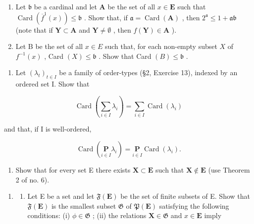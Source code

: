 \begin{enumerate}
\def\labelenumi{(\alph{enumi})}
\item
  Let \(\mathfrak{b}\) be a cardinal and let \(\mathbf{A}\) be the set of all \(x \in \mathbf{E}\) such that \(\operatorname{Card}(\overline{f}^1(x)) \leqslant \mathfrak{b}\) . Show that, if \(\mathfrak{a} = \operatorname{Card}(\mathbf{A})\) , then \(2^{\mathfrak{a}} \leqslant 1 + \mathfrak{a}\mathfrak{b}\) (note that if \(\mathbf{Y} \subset \mathbf{A}\) and \(\mathbf{Y} \neq \emptyset\) , then \(f(\mathbf{Y}) \in \mathbf{A}\) ).
\item
  Let B be the set of all \(x \in E\) such that, for each non-empty subset \(X\) of \(f^{-1}(x)\) , Card \((X) \leqslant \mathfrak{b}\) . Show that Card \((B) \leqslant \mathfrak{b}\) .
\end{enumerate}

\begin{enumerate}
\def\labelenumi{\arabic{enumi}.}
\setcounter{enumi}{4}
\tightlist
\item
  Let \((\lambda_{t})_{t\in I}\) be a family of order-types (§2, Exercise 13), indexed by an ordered set I. Show that
\end{enumerate}

\[
\operatorname{Card} \left(\sum_ {i \in I} \lambda_ {i}\right) = \sum_ {i \in I} \operatorname{Card} \left(\lambda_ {i}\right)
\]

and that, if I is well-ordered,

\[
\operatorname{Card} \left(\underset {i \in I} {\mathbf {P}} \lambda_ {i}\right) = \underset {i \in I} {\mathbf {P}} \operatorname{Card} \left(\lambda_ {i}\right).
\]

\begin{enumerate}
\def\labelenumi{\arabic{enumi}.}
\setcounter{enumi}{5}
\tightlist
\item
  Show that for every set E there exists \(\mathbf{X} \subset \mathbf{E}\) such that \(\mathbf{X} \notin \mathbf{E}\) (use Theorem 2 of no. 6).
\end{enumerate}

\exercisegroup

\begin{enumerate}
\def\labelenumi{\arabic{enumi}.}
\tightlist
\item
  \begin{enumerate}
  \def\labelenumii{(\alph{enumii})}
  \tightlist
  \item
    Let E be a set and let \(\mathfrak{F}(\mathbf{E})\) be the set of finite subsets of E. Show that \(\mathfrak{F}(\mathbf{E})\) is the smallest subset \(\mathfrak{G}\) of \(\mathfrak{P}(\mathbf{E})\) satisfying the following conditions: (i) \(\phi \in \mathfrak{G}\) ; (ii) the relations \(\mathbf{X} \in \mathfrak{G}\) and \(x \in \mathbf{E}\) imply
  \end{enumerate}
\end{enumerate}

